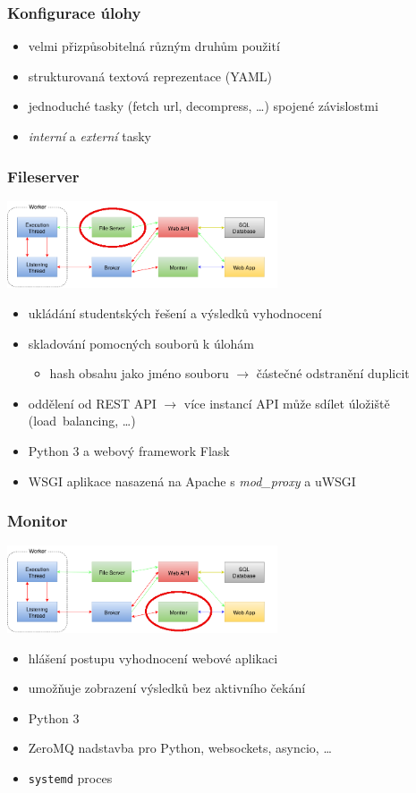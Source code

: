 \documentclass{beamer}
\begin{document}
\begin{frame}
	\frametitle{Konfigurace úlohy}
	\begin{itemize}
		\item velmi přizpůsobitelná různým druhům použití
		\item strukturovaná textová reprezentace (YAML)
		\item jednoduché tasky (fetch url, decompress, \dots) spojené závislostmi
		\item \textit{interní} a \textit{externí} tasky
	\end{itemize}
\end{frame}

\begin{frame}
	\frametitle{Fileserver}
	\begin{center}
		\includegraphics[width=0.6\textwidth]{images/communication-fileserver.png}
	\end{center}
	\begin{itemize}
		\item ukládání studentských řešení a výsledků vyhodnocení
		\item skladování pomocných souborů k úlohám
			\begin{itemize}
				\item hash obsahu jako jméno souboru $\rightarrow$ částečné odstranění duplicit
			\end{itemize}
		\item oddělení od REST API $\rightarrow$ více instancí API může sdílet úložiště (load~balancing, \dots)
		\item Python 3 a webový framework Flask
		\item WSGI aplikace nasazená na Apache s {\it mod\_proxy} a uWSGI
	\end{itemize}
\end{frame}

\begin{frame}
	\frametitle{Monitor}
	\begin{center}
		\includegraphics[width=0.6\textwidth]{images/communication-monitor.png}
	\end{center}
	\begin{itemize}
		\item hlášení postupu vyhodnocení webové aplikaci
		\item umožňuje zobrazení výsledků bez aktivního čekání
		\item Python 3
		\item ZeroMQ nadstavba pro Python, websockets, asyncio, \dots
		\item \texttt{systemd} proces
	\end{itemize}
\end{frame}
\end{document}
